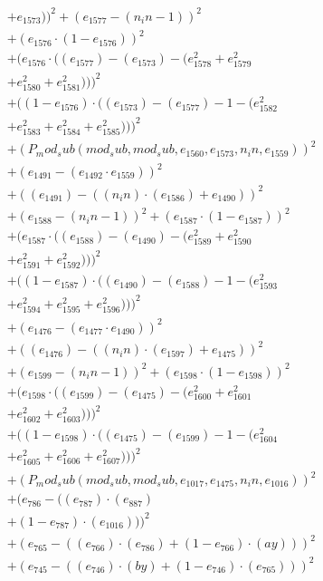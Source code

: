 \documentclass[10pt, a4paper]{article}
\begin{document}
\begin{small}
\begin{align*}
& + e_{1573}))^{2} + (e_{1577} - (n_in - 1))^{2} \\
& + (e_{1576}  \cdot  (1 - e_{1576}))^{2} \\
& + (e_{1576}  \cdot  ((e_{1577}) - (e_{1573}) - (e_{1578}^{2} + e_{1579}^{2} \\
& + e_{1580}^{2} + e_{1581}^{2})))^{2} \\
& + ((1 - e_{1576})  \cdot  ((e_{1573}) - (e_{1577}) - 1 - (e_{1582}^{2} \\
& + e_{1583}^{2} + e_{1584}^{2} + e_{1585}^{2})))^{2} \\
& + (P_mod_sub(mod_sub, mod_sub, e_{1560}, e_{1573}, n_in, e_{1559}))^{2} \\
& + (e_{1491} - (e_{1492}  \cdot  e_{1559}))^{2} \\
& + ((e_{1491}) - ((n_in)  \cdot  (e_{1586}) + e_{1490}))^{2} \\
& + (e_{1588} - (n_in - 1))^{2} + (e_{1587}  \cdot  (1 - e_{1587}))^{2} \\
& + (e_{1587}  \cdot  ((e_{1588}) - (e_{1490}) - (e_{1589}^{2} + e_{1590}^{2} \\
& + e_{1591}^{2} + e_{1592}^{2})))^{2} \\
& + ((1 - e_{1587})  \cdot  ((e_{1490}) - (e_{1588}) - 1 - (e_{1593}^{2} \\
& + e_{1594}^{2} + e_{1595}^{2} + e_{1596}^{2})))^{2} \\
& + (e_{1476} - (e_{1477}  \cdot  e_{1490}))^{2} \\
& + ((e_{1476}) - ((n_in)  \cdot  (e_{1597}) + e_{1475}))^{2} \\
& + (e_{1599} - (n_in - 1))^{2} + (e_{1598}  \cdot  (1 - e_{1598}))^{2} \\
& + (e_{1598}  \cdot  ((e_{1599}) - (e_{1475}) - (e_{1600}^{2} + e_{1601}^{2} \\
& + e_{1602}^{2} + e_{1603}^{2})))^{2} \\
& + ((1 - e_{1598})  \cdot  ((e_{1475}) - (e_{1599}) - 1 - (e_{1604}^{2} \\
& + e_{1605}^{2} + e_{1606}^{2} + e_{1607}^{2})))^{2} \\
& + (P_mod_sub(mod_sub, mod_sub, e_{1017}, e_{1475}, n_in, e_{1016}))^{2} \\
& + (e_{786} - ((e_{787})  \cdot  (e_{887}) \\
& + (1 - e_{787})  \cdot  (e_{1016})))^{2} \\
& + (e_{765} - ((e_{766})  \cdot  (e_{786}) + (1 - e_{766})  \cdot  (ay)))^{2} \\
& + (e_{745} - ((e_{746})  \cdot  (by) + (1 - e_{746})  \cdot  (e_{765})))^{2} \\

\end{align*}
\end{small}
\end{document}
